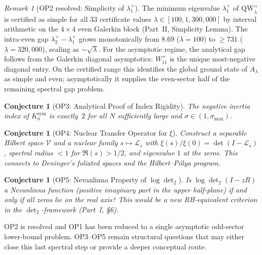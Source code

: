 \documentclass[12pt,a4paper]{article}
\newtheorem{conjecture}[theorem]{Conjecture}
\theoremstyle{definition}
\theoremstyle{remark}
\newtheorem{remark}[theorem]{Remark}
\newcommand{\Ksym}{K_\sigma^{\mathrm{sym}}}
\begin{document}
\begin{remark}[OP2 resolved: Simplicity of $\lambda_1^+$]
\label{rem:OP2-resolved}
The minimum eigenvalue $\lambda_1^+$ of $\mathrm{QW}_\lambda^+$ is certified
as simple for all $33$ certificate values $\lambda \in [100, 1{,}300{,}000]$
by interval arithmetic on the $4 \times 4$ even Galerkin block (Part~II,
Simplicity Lemma). The intra-even gap $\lambda_2^+ - \lambda_1^+$ grows
monotonically from $8.69$ ($\lambda = 100$) to $\geq 731$
($\lambda = 320{,}000$), scaling as $\sim\!\sqrt{\lambda}$. For the
asymptotic regime, the analytical gap follows from the Galerkin diagonal
asymptotics: $W_{11}^+$ is the unique most-negative diagonal entry. On the
certified range this identifies the global ground state of $A_\lambda$ as
simple and even; asymptotically it supplies the even-sector half of the
remaining spectral gap problem.
\end{remark}

\begin{conjecture}[OP3: Analytical Proof of Index Rigidity]
\label{conj:OP3}
The negative inertia index of $\Ksym$ is exactly~$2$ for all $N$ sufficiently large and $\sigma \in (1, \sigma_{\max})$.
\end{conjecture}

\begin{conjecture}[OP4: Nuclear Transfer Operator for $\xi$]
\label{conj:OP4}
Construct a separable Hilbert space $\mathcal{V}$ and a nuclear family $s \mapsto \mathcal{L}_s$ with $\xi(s)/\xi(0) = \det(I - \mathcal{L}_s)$, spectral radius $< 1$ for $\Re(s) > 1/2$, and eigenvalue $1$ at the zeros. This connects to Deninger's foliated spaces and the Hilbert--P\'olya program.
\end{conjecture}

\begin{conjecture}[OP5: Nevanlinna Property of $\log\det_2$]
\label{conj:OP5}
Is $\log\det_2(I - zR)$ a Nevanlinna function (positive imaginary part in the upper half-plane) if and only if all zeros lie on the real axis? This would be a new RH-equivalent criterion in the $\det_2$-framework (Part~I, \S6).
\end{conjecture}

\noindent OP2 is resolved and OP1 has been reduced to a single asymptotic
odd-sector lower-bound problem. OP3--OP5 remain structural questions that may
either close this last spectral step or provide a deeper conceptual route.


\end{document}
